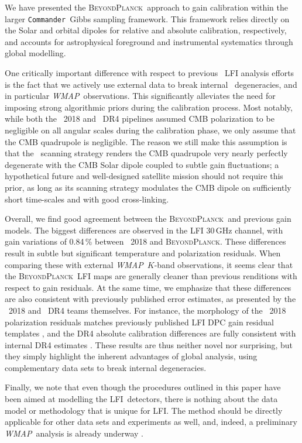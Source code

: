 \documentclass[twocolumn]{aa}
\def\WMAP{\textit{WMAP}}
\def\commander{\texttt{Commander}}
\newcommand{\BP}{\textsc{BeyondPlanck}}
\newcommand{\lfi}[0]{LFI}
\begin{document}
We have presented the \BP\ approach to gain calibration within the
larger \commander\ Gibbs sampling framework. This framework relies
directly on the Solar and orbital dipoles for relative and absolute
calibration, respectively, and accounts for astrophysical foreground
and instrumental systematics through global modelling.

One critically important difference with respect to previous
\Planck\ LFI analysis efforts is the fact that we actively use
external data to break internal \Planck\ degeneracies, and in
particular \WMAP\ observations. This significantly alleviates the need
for imposing strong algorithmic priors during the calibration
process. Most notably, while both the \Planck\ 2018 and
\Planck\ DR4 pipelines assumed CMB polarization to be negligible on all
angular scales during the calibration phase, we only assume that the
CMB quadrupole is negligible. The reason we still make this assumption
is that the \Planck\ scanning strategy renders the CMB quadrupole very
nearly perfectly degenerate with the CMB Solar dipole coupled to
subtle gain fluctuations; a hypothetical future and well-designed
satellite mission should not require this prior, as long as its
scanning strategy modulates the CMB dipole on sufficiently short
time-scales and with good cross-linking.

Overall, we find good agreement between the \BP\ and previous gain
models. The biggest differences are observed in the LFI 30\,GHz
channel, with gain variations of 0.84\,\%  between \Planck\ 2018 and \BP. These differences
result in subtle but significant temperature and polarization
residuals. When comparing these with external \WMAP\ $K$-band
observations, it seems clear that the \BP\ LFI maps are generally
cleaner than previous renditions with respect to gain residuals. At
the same time, we emphasize that these differences are also consistent
with previously published error estimates, as presented by the
\Planck\ 2018 and \Planck\ DR4 teams themselves. For instance, the
morphology of the \Planck\ 2018 polarization residuals matches
previously published LFI DPC gain residual templates
\citep{planck2016-l02}, and the DR4 absolute calibration
differences are fully consistent with internal DR4 estimates
\citep{planck2020-LVII}. These results are thus neither novel nor
surprising, but they simply highlight the inherent advantages of
global analysis, using complementary data sets to break internal
degeneracies.

Finally, we note that even though the procedures outlined in this
paper have been aimed at modelling the \lfi\ detectors, there is
nothing about the data model or methodology that is unique for
\lfi. The method should be directly applicable for other data sets and
experiments as well, and, indeed, a preliminary \WMAP\ analysis is
already underway \citep{bp17}.






\end{document}
